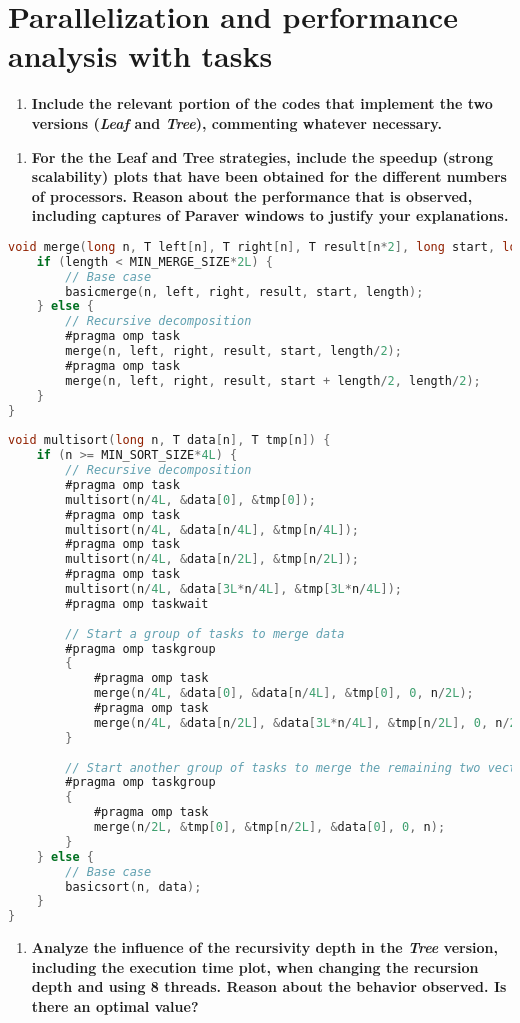 \documentclass[a4paper]{article}
\newenvironment{questionenum}{%
\setlist[enumerate]{resume}
\restartlist{enumerate}
\newcommand{\question}[1]{
\begin{enumerate}
	\item\bfseries ##1
\end{enumerate}
}}{%
}
\begin{document}
\section{Parallelization and performance analysis with tasks}
\begin{questionenum}
	\question{Include the relevant portion of the codes that implement the two versions (\textit{Leaf} and \textit{Tree}), commenting whatever necessary.}
	\question{For the the Leaf and Tree strategies, include the speedup (strong scalability) plots that have been obtained for the different numbers of processors. Reason about the performance that is observed, including captures of Paraver windows to justify your explanations.}
    \begin{lstlisting}[language=C, title=\texttt{multisort-omp-tree.c}]
void merge(long n, T left[n], T right[n], T result[n*2], long start, long length) {
    if (length < MIN_MERGE_SIZE*2L) {
        // Base case
        basicmerge(n, left, right, result, start, length);
    } else {
        // Recursive decomposition
        #pragma omp task
        merge(n, left, right, result, start, length/2);
        #pragma omp task
        merge(n, left, right, result, start + length/2, length/2);
    }
}
    
void multisort(long n, T data[n], T tmp[n]) {
    if (n >= MIN_SORT_SIZE*4L) {
        // Recursive decomposition
        #pragma omp task
        multisort(n/4L, &data[0], &tmp[0]);
        #pragma omp task
        multisort(n/4L, &data[n/4L], &tmp[n/4L]);
        #pragma omp task
        multisort(n/4L, &data[n/2L], &tmp[n/2L]);
        #pragma omp task
        multisort(n/4L, &data[3L*n/4L], &tmp[3L*n/4L]);
        #pragma omp taskwait
        
        // Start a group of tasks to merge data
        #pragma omp taskgroup
        {
            #pragma omp task
            merge(n/4L, &data[0], &data[n/4L], &tmp[0], 0, n/2L);
            #pragma omp task
            merge(n/4L, &data[n/2L], &data[3L*n/4L], &tmp[n/2L], 0, n/2L);
        }
        
        // Start another group of tasks to merge the remaining two vectors
        #pragma omp taskgroup
        {
            #pragma omp task
            merge(n/2L, &tmp[0], &tmp[n/2L], &data[0], 0, n);
        }
    } else {
        // Base case
        basicsort(n, data);
    }
}
    \end{lstlisting}
    
	\question{Analyze the influence of the recursivity depth in the \textit{Tree} version, including the execution time plot, when changing the recursion depth and using 8 threads. Reason about the behavior observed. Is there an optimal value?}
\end{questionenum}
\end{document}
